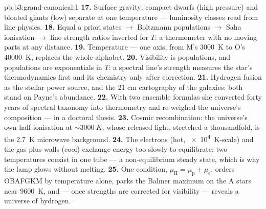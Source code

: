 \begin{solution}{pb:b3:grand-canonical:1}
\textbf{17.} Surface gravity: compact dwarfs (high pressure) and
bloated giants (low) separate at one temperature --- luminosity
classes read from line physics.
\textbf{18.} Equal a priori states $\to$ Boltzmann populations
$\to$ Saha ionisation $\to$ line-strength ratios inverted for
$T$: a thermometer with no moving parts at any distance.
\textbf{19.} Temperature --- one axis, from M's \qty{3000}{K} to
O's \qty{40000}{K}, replaces the whole alphabet.
\textbf{20.} Visibility is populations, and populations are
exponentials in $T$: a spectral line's strength measures the
star's thermodynamics first and its chemistry only after
correction.
\textbf{21.} Hydrogen fusion as the stellar power source, and
the 21 cm cartography of the galaxies: both stand on Payne's
abundance.
\textbf{22.} With two ensemble formulas she converted forty years
of spectral taxonomy into thermometry and re-weighed the
universe's composition --- in a doctoral thesis.
\textbf{23.} Cosmic recombination: the universe's own
half-ionisation at $\sim\qty{3000}{K}$, whose released light,
stretched a thousandfold, is the \qty{2.7}{K} microwave
background.
\textbf{24.} The electrons (hot, \qty{e4}{K}-scale) and the gas
plus walls (cool) exchange energy too slowly to equilibrate: two
temperatures coexist in one tube --- a non-equilibrium steady
state, which is why the lamp glows without melting.
\textbf{25.} One condition, $\mu_{\text{H}} = \mu_{\text{p}} +
\mu_{\text{e}}$, orders OBAFGKM by temperature alone, parks the
Balmer maximum on the A stars near \qty{9600}{K}, and --- once
strengths are corrected for visibility --- reveals a universe of
hydrogen.
\end{solution}
